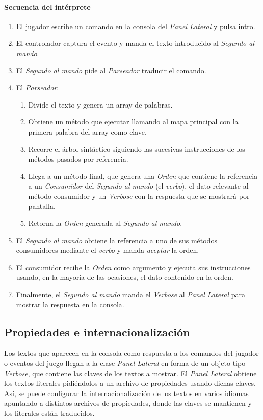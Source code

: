 \documentclass[a4paper,
	11pt,
	parskip=full,
	bibliography=totoc,
	twoside
	]{scrartcl}
\begin{document}
		\paragraph{Secuencia del intérprete}
		\begin{enumerate}[noitemsep]
			\item El jugador escribe un comando en la consola del \textit{Panel Lateral} y pulsa intro.
			\item El controlador captura el evento y manda el texto introducido al \textit{Segundo al mando}.
			\item El \textit{Segundo al mando} pide al \textit{Parseador} traducir el comando.
			\item El \textit{Parseador}:
			\begin{enumerate}[noitemsep]
				\item Divide el texto y genera un array de palabras.
				\item Obtiene un método que ejecutar llamando al mapa principal con la primera palabra del array como clave.
				\item Recorre el árbol sintáctico siguiendo las sucesivas instrucciones de los métodos pasados por referencia.
				\item Llega a un método final, que genera una \textit{Orden} que contiene la referencia a un \textit{Consumidor} del \textit{Segundo al mando} (el \textit{verbo}), el dato relevante al método consumidor y un \textit{Verbose} con la respuesta que se mostrará por pantalla.
				\item Retorna la \textit{Orden} generada al \textit{Segundo al mando}.
			\end{enumerate}
			\item El \textit{Segundo al mando} obtiene la referencia a uno de sus métodos consumidores mediante el \textit{verbo} y manda \textit{aceptar} la orden.
			\item El consumidor recibe la \textit{Orden} como argumento y ejecuta sus instrucciones usando, en la mayoría de las ocasiones, el dato contenido en la orden.
			\item Finalmente, el \textit{Segundo al mando} manda el \textit{Verbose} al \textit{Panel Lateral} para mostrar la respuesta en la consola.
		\end{enumerate}
	
	\clearpage
	\subsection{Propiedades e internacionalización}
	\label{subsec:propiedades_internacionalizacion}
		Los textos que aparecen en la consola como respuesta a los comandos del jugador o eventos del juego llegan a la clase \textit{Panel Lateral} en forma de un objeto tipo \textit{Verbose}, que contiene las claves de los textos a mostrar. El \textit{Panel Lateral} obtiene los textos literales pidiéndolos a un archivo de propiedades usando dichas claves. Así, se puede configurar la internacionalización de los textos en varios idiomas apuntando a distintos archivos de propiedades, donde las claves se mantienen y los literales están traducidos.
		
\end{document}
